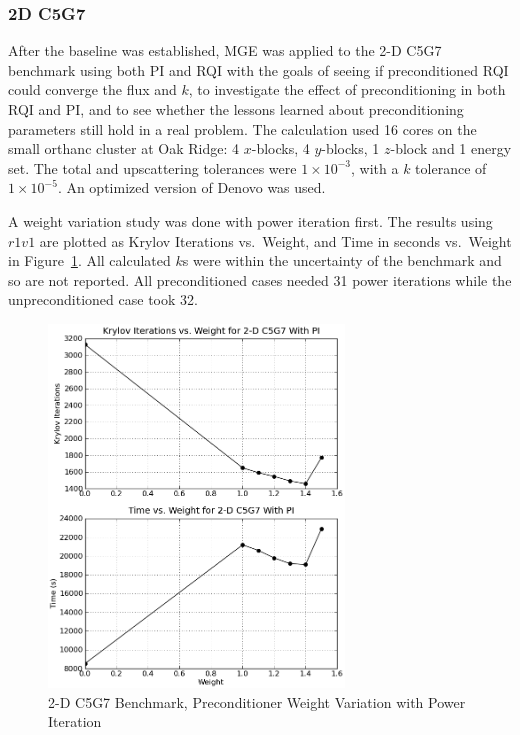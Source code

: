 \documentclass[preprint,12pt]{elsarticle}
\begin{document}
\subsubsection{2D C5G7}
\label{subsec:2dc5g7}
After the baseline was established, MGE was applied to the 2-D C5G7 benchmark using both PI and RQI with the goals of seeing if preconditioned RQI could converge the flux and $k$, to investigate the effect of preconditioning in both RQI and PI, and to see whether the lessons learned about preconditioning parameters still hold in a real problem. The calculation used 16 cores on the small orthanc cluster at Oak Ridge: 4 $x$-blocks, 4 $y$-blocks, 1 $z$-block and 1 energy set. The total and upscattering tolerances were $1 \times 10^{-3}$, with a $k$ tolerance of $1 \times 10^{-5}$. An optimized version of Denovo was used.  

A weight variation study was done with power iteration first. The results using $r1v1$ are plotted as Krylov Iterations vs.\ Weight, and Time in seconds vs.\ Weight in Figure~\ref{fig:2-Dc5g7PI}. All calculated $k$s were within the uncertainty of the benchmark and so are not reported. All preconditioned cases needed 31 power iterations while the unpreconditioned case took 32.
%
\begin{figure}[!ht]
    \begin{center}
      \includegraphics [width=0.7\textwidth, height=0.7\textheight] {2Dc5g7PI}
   \end{center}
   \caption{2-D C5G7 Benchmark, Preconditioner Weight Variation with Power Iteration}
   \label{fig:2-Dc5g7PI}
\end{figure}
\end{document}
